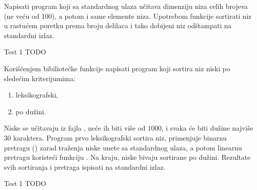 \begin{Exercise}[label=518]
  Napisati program koji sa standardnog ulaza učitava dimenziju niza
  celih brojeva (ne veću od 100), a potom i same elemente
  niza. Upotrebom funkcije  sortirati niz u rastućem
  poretku prema broju delilaca i tako dobijeni niz odštampati na
  standardni izlaz.
  
\begin{miditest}
\begin{test}{Test 1}
TODO
\end{test}
\end{miditest}
  
\end{Exercise}

\begin{Exercise}[label=519]
   Korišćenjem bibiliotečke funkcije  napisati program
   koji sortira niz niski po sledećim kriterijumima:
   \begin{enumerate}
   \item leksikografski,
   \item po dužini.
   \end{enumerate}
   Niske se učitavaju iz fajla , neće ih biti više od
   $1000$, i svaka će biti dužine najviše $30$ karaktera. Program prvo
   leksikografski sortira niz, primenjuje binarnu pretragu
   () zarad traženja niske unete sa standardnog ulaza,
   a potom linearnu pretragu koristeći funkciju . Na
   kraju, niske bivaju sortirane po dužini. Rezultate svih sortiranja
   i pretraga ispisati na standardni izlaz.
   
\begin{miditest}
\begin{test}{Test 1}
TODO
\end{test}
\end{miditest}
  
\end{Exercise}

